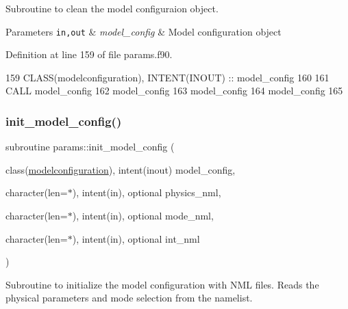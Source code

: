 Subroutine to clean the model configuraion object. 


\begin{DoxyParams}[1]{Parameters}
\mbox{\tt in,out}  & {\em model\+\_\+config} & Model configuration object \\
\hline
\end{DoxyParams}


Definition at line 159 of file params.\+f90.


\begin{DoxyCode}
159     \textcolor{keywordtype}{CLASS}(modelconfiguration), \textcolor{keywordtype}{INTENT(INOUT)} :: model\_config
160 
161     \textcolor{keyword}{CALL }model\_config%
162     model\_config%
163     model\_config%
164     model\_config%
165 
\end{DoxyCode}
\mbox{\label{namespaceparams_a31ec8602a62124ae49da2b78a35979c0}} 
\subsubsection{\texorpdfstring{init\+\_\+model\+\_\+config()}{init\_model\_config()}}
{\footnotesize\ttfamily subroutine params\+::init\+\_\+model\+\_\+config (\begin{DoxyParamCaption}\item[{class(\hyperlink{structparams_1_1modelconfiguration}{modelconfiguration}), intent(inout)}]{model\+\_\+config,  }\item[{character(len=$\ast$), intent(in), optional}]{physics\+\_\+nml,  }\item[{character(len=$\ast$), intent(in), optional}]{mode\+\_\+nml,  }\item[{character(len=$\ast$), intent(in), optional}]{int\+\_\+nml }\end{DoxyParamCaption})}



Subroutine to initialize the model configuration with N\+ML files. Reads the physical parameters and mode selection from the namelist. 


